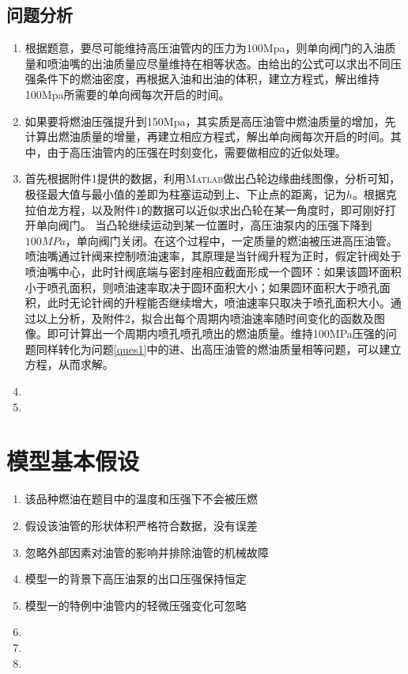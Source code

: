 \documentclass{cumcmthesis}
\begin{document}
\subsection{问题分析}
\begin{enumerate}[label=\Roman*.]
	\item 根据题意，要尽可能维持高压油管内的压力为100Mpa，则单向阀门的入油质量和喷油嘴的出油质量应尽量维持在相等状态。由给出的公式可以求出不同压强条件下的燃油密度，再根据入油和出油的体积，建立方程式，解出维持100Mpa所需要的单向阀每次开启的时间。
	\item 如果要将燃油压强提升到150Mpa，其实质是高压油管中燃油质量的增加，先计算出燃油质量的增量，再建立相应方程式，解出单向阀每次开启的时间。其中，由于高压油管内的压强在时刻变化，需要做相应的近似处理。
	\item 首先根据附件1提供的数据，利用\textsc{Matlab}做出凸轮边缘曲线图像，分析可知，极径最大值与最小值的差即为柱塞运动到上、下止点的距离，记为$h$。根据克拉伯龙方程，以及附件1的数据可以近似求出凸轮在某一角度时，即可刚好打开单向阀门。 当凸轮继续运动到某一位置时，高压油泵内的压强下降到$100MPa$，单向阀门关闭。在这个过程中，一定质量的燃油被压进高压油管。
	喷油嘴通过针阀来控制喷油速率，其原理是当针阀升程为正时，假定针阀处于喷油嘴中心，此时针阀底端与密封座相应截面形成一个圆环：如果该圆环面积小于喷孔面积，则喷油速率取决于圆环面积大小；如果圆环面积大于喷孔面积，此时无论针阀的升程能否继续增大，喷油速率只取决于喷孔面积大小。通过以上分析，及附件2，拟合出每个周期内喷油速率随时间变化的函数及图像。即可计算出一个周期内喷孔喷孔喷出的燃油质量。维持100MPa压强的问题同样转化为问题\ref{ques1}中的进、出高压油管的燃油质量相等问题，可以建立方程，从而求解。
	\item
	\item
\end{enumerate}
\section{模型基本假设}
\begin{enumerate}
	\item 该品种燃油在题目中的温度和压强下不会被压燃
	\item 假设该油管的形状体积严格符合数据，没有误差
	\item 忽略外部因素对油管的影响并排除油管的机械故障
	\item 模型一的背景下高压油泵的出口压强保持恒定
	\item 模型一的特例中油管内的轻微压强变化可忽略
	\item
	\item
	\item
\end{enumerate}
\end{document}
